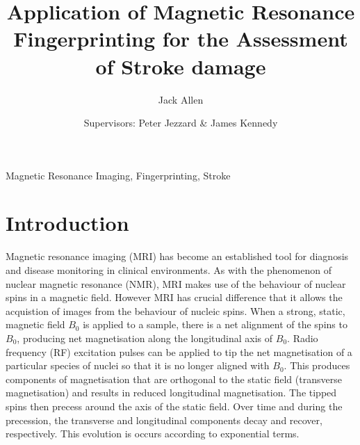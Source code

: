 \documentclass[review]{elsarticle}
\begin{document}
\begin{frontmatter}

\title{Application of Magnetic Resonance Fingerprinting for the Assessment of Stroke damage}

\author{Jack Allen}
\author{Supervisors: Peter Jezzard \& James Kennedy}
\address{University of Oxford, Oxford, UK.}





\begin{abstract}

\end{abstract}


\begin{keyword}
Magnetic Resonance Imaging, Fingerprinting, Stroke
\end{keyword}

\end{frontmatter}


\section{Introduction}

Magnetic resonance imaging (MRI) has become an established tool for diagnosis and disease monitoring in clinical environments. As with the phenomenon of nuclear magnetic resonance (NMR), MRI makes use of the behaviour of nuclear spins in a magnetic field. However MRI has crucial difference that it allows the acquistion of images from the behaviour of nucleic spins.  When a strong, static, magnetic field $B_0$ is applied to a sample, there is a net alignment of the spins to $B_0 $, producing net magnetisation along the longitudinal axis of $B_0$. Radio frequency (RF) excitation pulses can be applied to tip the net magnetisation of a particular species of nuclei so that it is no longer aligned with $B_0$. This produces components of magnetisation that are orthogonal to the static field (transverse magnetisation) and results in reduced longitudinal magnetisation. The tipped spins then precess around the axis of the static field. Over time and during the precession, the transverse and longitudinal components decay and recover, respectively. This evolution is occurs according to exponential terms.
\end{document}
